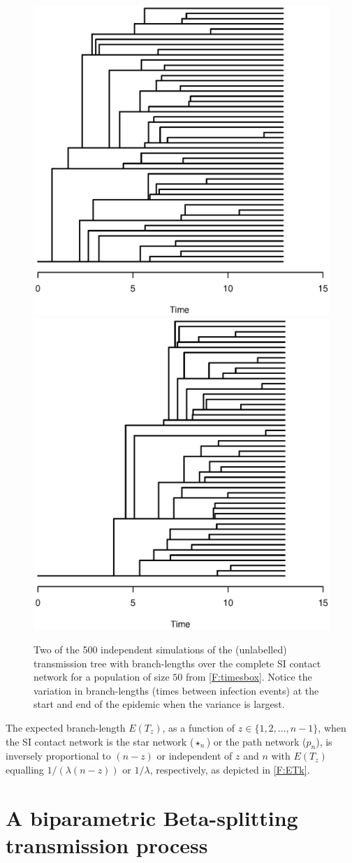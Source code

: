 \documentclass[review]{elsarticle}
\numberwithin{equation}{section}
\let\orgautoref\autoref
\renewcommand{\autoref}
        {\def\equationautorefname{Eq.}%
         \def\figureautorefname{Fig.}%
         \def\subfigureautorefname{Fig.}%
         \def\sectionautorefname{Sect.}%
         \def\subsectionautorefname{Sect.}%
         \def\subsubsectionautorefname{Sect.}%
         \def\Itemautorefname{item}%
         \def\tableautorefname{Table}%
         \def\propositionautorefname{Prop.}%
         \def\corollaryautorefname{Corollary}%
         \def\theoremautorefname{Theorem}%
         \def\remarkautorefname{Remark}%
         \def\lemmaautorefname{Lemma}%
         \def\proofofautorefname{Proof}%
         \def\exampleautorefname{Example}%
         \orgautoref}
\begin{document}
\begin{figure}[htbp]
\includegraphics[width=0.5\linewidth]{figures/tree-rand1.eps}
\includegraphics[width=0.5\linewidth]{figures/tree-rand2.eps}
\caption{Two of the 500 independent simulations of the (unlabelled) transmission tree with branch-lengths over the complete SI contact network for a population of size $50$ from \autoref{F:timesbox}. Notice the variation in branch-lengths (times between infection events) at the start and end of the epidemic when the variance is largest.\label{F:tree-rand12}}
\end{figure}


The expected branch-length $E(T_z)$, as a function of $z \in \{1,2,\ldots,n-1\}$, 
when the SI contact network is the star network ($\star_n$) or the path network ($p_n$), 
is inversely proportional to $(n-z)$ or independent of $z$ and $n$ with $E(T_z)$ 
equalling $1/(\lambda (n-z))$ or $1/\lambda$, respectively, as depicted in \autoref{F:ETk}. 


\section{A biparametric Beta-splitting transmission process}\label{S:BetaSplit}
\end{document}
